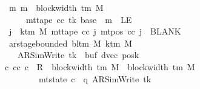 \begin{isabellebody}
\ \ \ \ \ \ \ \ \ \ \ \ \ \ \ \ \ {\isasymAnd}m{\isachardot}{\kern0pt}\ m\ {\isasymle}\ block{\isacharunderscore}{\kern0pt}width\ {\isacharparenleft}{\kern0pt}{\isasymGamma}{\isacharunderscore}{\kern0pt}tm\ M{\isacharparenright}{\kern0pt}\isanewline
\ \ \ \ \ \ \ \ \ \ \ \ \ \ \ \ \ \ \ \ {\isasymLongrightarrow}\ mt{\isacharunderscore}{\kern0pt}tape\ cc\ tk\ {\isacharparenleft}{\kern0pt}base\ {\isacharplus}{\kern0pt}\ m{\isacharparenright}{\kern0pt}\ {\isasymnoteq}\ LE{}{\isacharsemicolon}{\kern0pt}\isanewline
\ \ \ \ \ \ \ \ \ \ \ \ \ \ \ \ \ {\isasymforall}j\ {\isasymge}\ k{\isacharunderscore}{\kern0pt}tm\ M{\isachardot}{\kern0pt}\ mt{\isacharunderscore}{\kern0pt}tape\ cc\ j\ {\isacharparenleft}{\kern0pt}mt{\isacharunderscore}{\kern0pt}pos\ cc\ j{\isacharparenright}{\kern0pt}\ {\isacharequal}{\kern0pt}\ BLANK{}{\isacharsemicolon}{\kern0pt}\isanewline
\ \ \ \ \ \ \ \ \ \ \ \ \ \ \ \ \ ar{\isacharunderscore}{\kern0pt}stage{\isacharunderscore}{\kern0pt}bounded\ {\isacharparenleft}{\kern0pt}bl{\isacharunderscore}{\kern0pt}tm\ M{\isacharparenright}{\kern0pt}\ {\isacharparenleft}{\kern0pt}k{\isacharunderscore}{\kern0pt}tm\ M{\isacharparenright}{\kern0pt}\isanewline
\ \ \ \ \ \ \ \ \ \ \ \ \ \ \ \ \ \ \ {\isacharparenleft}{\kern0pt}AR{\isacharunderscore}{\kern0pt}SimWrite{\isacharcomma}{\kern0pt}\ tk{\isacharcomma}{\kern0pt}\ {}{\isacharcomma}{\kern0pt}\ buf{\isacharcomma}{\kern0pt}\ dvec{\isacharcomma}{\kern0pt}\ posk{\isacharparenright}{\kern0pt}\ {\isasymrbrakk}\isanewline
\ \ \ \ \ \ \ \ \ \ \ \ \ \ \ {\isasymLongrightarrow}\ {\isasymexists}c{}{\isachardot}{\kern0pt}\ {\isacharparenleft}{\kern0pt}cc{\isacharcomma}{\kern0pt}\ c{}{\isacharparenright}{\kern0pt}\ {\isasymin}\ R{\isacharprime}{\kern0pt}\ {\isacharcircum}{\kern0pt}{\isacharcircum}{\kern0pt}\ {\isacharparenleft}{\kern0pt}block{\isacharunderscore}{\kern0pt}width\ {\isacharparenleft}{\kern0pt}{\isasymGamma}{\isacharunderscore}{\kern0pt}tm\ M{\isacharparenright}{\kern0pt}\ {\isacharplus}{\kern0pt}\ {\isacharparenleft}{\kern0pt}block{\isacharunderscore}{\kern0pt}width\ {\isacharparenleft}{\kern0pt}{\isasymGamma}{\isacharunderscore}{\kern0pt}tm\ M{\isacharparenright}{\kern0pt}\ {\isacharminus}{\kern0pt}\ {}{\isacharparenright}{\kern0pt}{\isacharparenright}{\kern0pt}\isanewline
\ \ \ \ \ \ \ \ \ \ \ \ \ \ \ \ \ \ \ \ \ \ \ {\isasymand}\ mt{\isacharunderscore}{\kern0pt}state\ c{}\ {\isacharequal}{\kern0pt}\ {\isacharparenleft}{\kern0pt}q{\isacharcomma}{\kern0pt}\ AR{\isacharunderscore}{\kern0pt}SimWrite{\isacharcomma}{\kern0pt}\ tk{\isacharcomma}{\kern0pt}\isanewline

\end{isabellebody}
